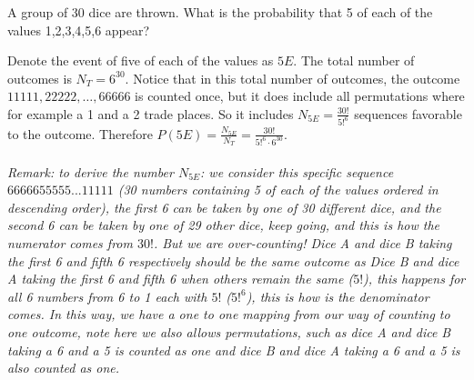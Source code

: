
\setcounter{theorem}{17}
\begin{exercise}[BH.1.36]
	A group of 30 dice are thrown. What is the probability that 5 of each of the values 1,2,3,4,5,6 appear?
\begin{solution}
	 Denote the event of five of each of the values as $5E$. The total number of outcomes is $N_{T}=6^{30}$.  Notice that in this total number of outcomes, the outcome $11111,22222,\ldots,66666$ is counted once, but it does include all permutations where for example a 1 and a 2 trade places. So it includes $N_{5E}=\frac{30!}{5!^6}$ sequences favorable to the outcome. Therefore $P(5E) = \frac{N_{5E}}{N_{T}} = \frac{30!}{5!^6\cdot 6^{30}}$.\\~\\
	 
	\textit{Remark: to derive the number $N_{5E}$: we consider this specific sequence $6666655555...11111$ (30 numbers containing 5 of each of the values ordered in descending order), the first 6 can be taken by one of 30 different dice, and the second 6 can be taken by one of 29 other dice, keep going, and this is how the numerator comes from $30!$. But we are over-counting! Dice A and dice B taking the first 6 and fifth 6 respectively should be the same outcome as Dice B and dice A taking the first 6 and fifth 6 when others remain the same ($5!$), this happens for all 6 numbers from 6 to 1 each with $5!$ ($5!^6$), this is how is the denominator comes. In this way, we have a one to one mapping from our way of counting to one outcome, note here we also allows permutations, such as dice A and dice B taking a 6 and a 5 is counted as one and dice B and dice A taking a 6 and a 5 is also counted as one.}
\end{solution}
\end{exercise}


